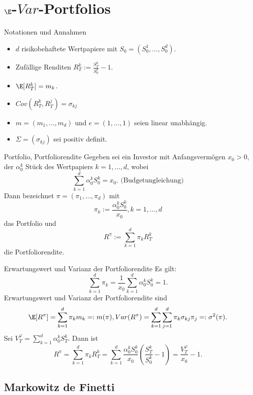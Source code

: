 \section{\(\E\)-\(Var\)-Portfolios}

\begin{karte}{Notationen und Annahmen}
\begin{itemize}
    \item \(d\) risikobehaftete Wertpapiere mit \(S_0 = (S_0^1, \ldots, S_0^d)\).
    \item Zufällige Renditen \(R_T^k := \frac{S_T^k}{S_0^k} - 1\).
    \item \(\E[R_T^k] = m_k\).
    \item \(Cov(R_T^k, R_T^j) = \sigma_{kj}\)
    \item \(m = (m_1, \ldots, m_d)\) und \(e = (1, \ldots, 1)\) seien linear unabhängig.
    \item \(\Sigma = (\sigma_{kj})\) sei positiv definit.
\end{itemize}
\end{karte}

\begin{karte}{Portfolio, Portfoliorendite}
Gegeben sei ein Investor mit Anfangsvermögen \(x_0 > 0\), 
der \(\alpha_0^k\) Stück des Wertpapiers \(k = 1, \ldots, d\), 
wobei 
\[ \sum_{k=1}^d \alpha_0^k S_0^k = x_0. \text{ (Budgetungleichung)} \]
Dann bezeichnet \(\pi = (\pi_1, \ldots, \pi_d)\) mit 
\[ \pi_k := \frac{\alpha_0^k S_0^k}{x_0}, k=1,\ldots, d \]
das Portfolio und 
\[ R^\pi := \sum_{k=1}^d \pi_k R_T^k \]
die Portfoliorendite.
\end{karte}

\begin{karte}{Erwartungswert und Varianz der Portfoliorendite}
Es gilt: 
\[ \sum_{k=1}^d \pi_k = \frac{1}{x_0} \sum_{k=1}^d \alpha_0^k S_0^k = 1. \]
Erwartungswert und Varianz der Portfoliorendite sind 
\[ \E[R^\pi] = \sum_{k=1}^d \pi_k m_k =: m(\pi), Var(R^\pi) = \sum_{k=1}^d \sum_{j=1}^d \pi_k \sigma_{kj} \pi_j =: \sigma^2(\pi). \]
Sei \(V_T^\varphi = \sum_{k=1}^d \alpha_0^k S_T^k\). Dann ist 
\[ R^\pi = \sum_{k=1}^d \pi_k R_T^k = \sum_{k=1}^d \frac{\alpha_0^k S_0^k}{x_0} \left( \frac{S_T^k}{S_0^k} - 1 \right) = \frac{V_T^\varphi}{x_0} - 1. \]
\end{karte}

\subsection{Markowitz de Finetti}

